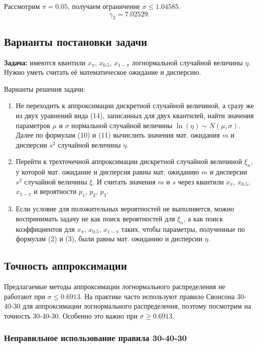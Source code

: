 \documentclass[12pt]{article}
\begin{document}
	Рассмотрим $\pi = 0.05$, получаем ограничение $\sigma \leq 1.04585$.
	\[\gamma_{3} = 7.02529.\]
	
	\subsection{Варианты постановки задачи}
	
	\textbf{Задача:} имеются квантили $x_{\pi}$, $x_{0.5}$, $x_{1-\pi}$ логнормальной случайной величины $\eta$. Нужно уметь считать её математическое ожидание и дисперсию.
	
	Варианты решения задачи:
	\begin{enumerate}
		\item Не переходить к аппроксимации дискретной случайной величиной, а сразу же из двух уравнений вида (14), записанных для двух квантилей, найти значения параметров $\mu$ и $\sigma$ нормальной случайной величины $\ln(\eta)\sim N(\mu, \sigma)$. Далее по формулам (10) и (11) вычислить значения мат. ожидания $m$ и дисперсии $s^{2}$ случайной величины $\eta$.
		\item Перейти к трехточечной аппроксимации дискретной случайной величиной $\xi_{n}$, у которой мат. ожидание и дисперсия равны мат. ожиданию $m$ и дисперсии $s^{2}$ случайной величины $\xi$. И считать значения $m$ и $s$ через квантили $x_{\pi}$, $x_{0.5}$, $x_{1-\pi}$ и вероятности $p_{1}$, $p_{2}$, $p_{3}$.
		\item Если условие для положительных вероятностей не выполняется, можно воспринимать задачу не как поиск вероятностей для $\xi_{n}$, а как поиск коэффициентов для $x_{\pi}$, $x_{0.5}$, $x_{1-\pi}$ таких, чтобы параметры, полученные по формулам (2) и (3), были равны мат. ожиданию и дисперсии $\eta$. 
	\end{enumerate}
	
	\subsection{Точность аппроксимации}

 Предлагаемые методы аппроксимации логнормального распределения не работают при $\sigma \leq 0.6913$. На практике часто используют правило Свонсона 30-40-30 для аппроксимации логнормального распределения, поэтому посмотрим на точность 30-40-30. Особенно это важно при $\sigma \geq 0.6913$.
	
\subsubsection{Неправильное использование правила 30-40-30}
\end{document}
